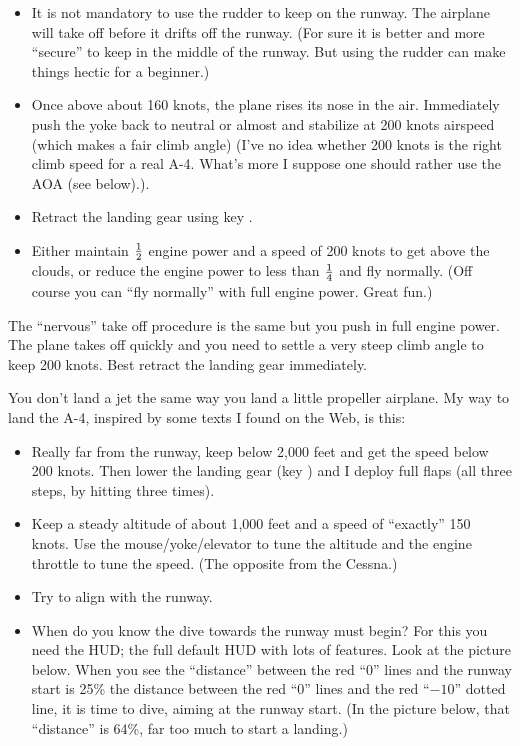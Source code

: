 \begin{itemize}
\begin{itemize}
  \item It is not mandatory to use the rudder to keep on the runway. The airplane will take off before it drifts off the runway. (For sure it is better and more ``secure'' to keep in the middle of the runway. But using the rudder can make things hectic for a beginner.)
  \item Once above about 160 knots, the plane rises its nose in the air. Immediately push the yoke back to neutral or almost and stabilize at 200 knots airspeed (which makes a fair climb angle) (I've no idea whether 200 knots is the right climb speed for a real A-4. What's more I suppose one should rather use the AOA (see below).).
  \item Retract the landing gear using key  .
  \item Either maintain $1\over2$ engine power and a speed of 200 knots to get above the clouds, or reduce the engine power to less than $1\over4$ and fly normally. (Off course you can ``fly normally'' with full engine power. Great fun.)
\end{itemize}

The ``nervous'' take off procedure is the same but you push in full
engine power. The plane takes off quickly and you need to settle a very
steep climb angle to keep 200 knots. Best retract the landing gear
immediately.

You don't land a jet the same way you land a little propeller airplane.
My way to land the A-4, inspired by some texts I found on the Web, is
this:
\begin{itemize}
    \item Really far from the runway, keep below 2,000 feet and get the speed below 200 knots. Then lower the landing gear (key ) and I deploy full flaps (all three steps, by hitting \key{]} three times).
    \item Keep a steady altitude of about 1,000 feet and a speed of ``exactly'' 150 knots. Use the mouse/yoke/elevator to tune the altitude and the engine throttle to tune the speed. (The opposite from the Cessna.)
    \item Try to align with the runway.
    \item When do you know the dive towards the runway must begin? For this you need the  HUD; the full default HUD with lots of features. Look at the picture below. When you see the ``distance'' between the red ``0'' lines and the runway start is 25\% the distance between the red ``0'' lines and the red ``$-10$'' dotted line, it is time to dive, aiming at the runway start. (In the picture below, that ``distance'' is 64\%, far too much to start a landing.)



\end{itemize}
\end{itemize}
